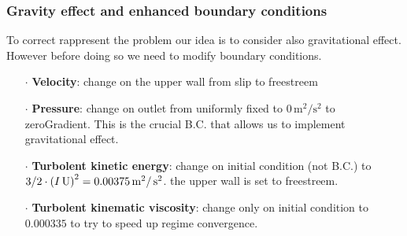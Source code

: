\documentclass{beamer}
\newcommand{\foam}[1]{{\ttfamily #1}}
\begin{document}
\begin{frame}
\frametitle{Gravity effect and enhanced boundary conditions}

To correct rappresent the problem our idea is to consider also gravitational effect. 
However before doing so we need to modify boundary conditions.

\begin{itemize}
\item[$\cdot$] \textbf{Velocity}: change on the upper wall from \foam{slip} to \foam{freestreem}

\item[$\cdot$] \textbf{Pressure}: change on outlet from uniformly fixed to $0 \,\text{m}^2/\text{s}^2$ to \foam{zeroGradient}. 
This is the crucial B.C. that allows us to implement gravitational effect.

\item[$\cdot$] \textbf{Turbolent kinetic energy}: change on initial condition (not B.C.) to  $ 3/2 \cdot \left(I\, \text{U} \right) ^2 = 0.00375 \,\text{m}^2 / \,\text{s}^2$.
the upper wall is set to \foam{freestreem}.

\item[$\cdot$] \textbf{Turbolent kinematic viscosity}: change only on initial condition to $0.000335$ to try to speed up regime convergence.
\end{itemize}

\end{frame}
\end{document}
